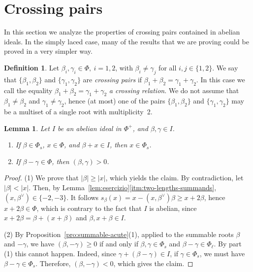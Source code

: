 \documentclass[10pt]{amsart}
\newtheorem{lem}[thm]{Lemma}
\theoremstyle{definition}
\newtheorem{defi}[thm]{Definition}
\theoremstyle{remark}
\newcommand\be{\beta}
\newcommand\ga{\gamma}
\begin{document}
\section{Crossing pairs}\label{sec:crossingpairs}

In this section we analyze the properties of crossing pairs contained in abelian ideals. 
In the simply laced case, many of the results that we are proving could be proved in a very simpler way.

\begin{defi}\label{def:crossing}
Let $\be_i, \ga_i\in \Phi, \ i=1, 2$, with $\be_i\neq \ga_j$ for all $i, j\in \{1, 2\}$. 
We say that 
$\{\be_1, \be_2\}$ and  $\{\ga_1, \ga_2\}$  are {\it crossing pairs} if $\be_1+\be_2=\ga_1+\ga_2$. 
In this case we call the equality $\be_1+\be_2=\ga_1+\ga_2$ {\it a crossing relation}. 
We do not assume that $\be_1\neq\be_2$ and $\ga_1\neq\ga_2$, hence (at most) one of the pairs $\{\be_1, \be_2\}$ and $\{\ga_1, \ga_2\}$ may be a multiset of a single root with multiplicity~2. 
\end{defi}

\begin{lem}\label{lem:corte-abeliani}
Let $I$ be an abelian ideal in $\Phi^+$, and $\be, \ga\in I$. 
\begin{enumerate} 
\item
If $\be\in \Phi_s$, $x\in \Phi$, and $\be+x\in I$, then $x\in \Phi_s$.
\label{itm:short-edge}
\item
If $\be-\ga\in\Phi$, then $(\be,\ga)> 0$.
\label{itm:non-ortogonali}
\end{enumerate}
\end{lem}

\begin{proof}
(1) We prove that $|\be|\geq |x|$, which yields the claim.
By contradiction, let $|\be|<|x|$. 
Then, by Lemma~\ref{lem:esercizio}\ref{itm:two-lengths-summands}, $(x, \be^\vee)\in \{-2, -3\}$. 
It follows $s_\be(x)=x -(x, \be^\vee)\be \geq x +2\be$, 
hence $x +2\be\in \Phi$, which is contrary to the fact that $I$ is abelian, since $x+2\be=\be+(x+\be)$ and $\be, x+\be\in I$.
\par
(2) By Proposition~\ref{pro:summable-acute}(1), applied to the summable roots $\be$ and $-\ga$, we have $(\be, -\ga)\geq 0$ if and only if $\be, \ga\in\Phi_s$ and $\be-\ga\in\Phi_\ell$. 
By part (1) this cannot happen. 
Indeed, since $\ga+(\be-\ga)\in I$, if $\ga\in \Phi_s$,   we must have $\be-\ga\in \Phi_s$.
Therefore,  $(\be, -\ga)<0$, which gives the claim.
\end{proof}
\end{document}
